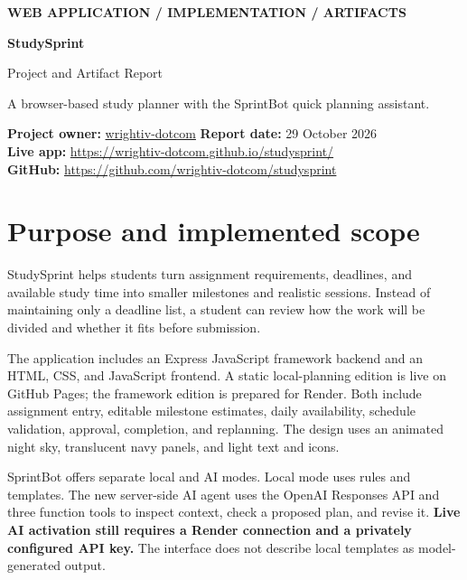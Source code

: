 \documentclass[11pt,letterpaper]{article}
\begin{document}
{\color{blue}\small\bfseries WEB APPLICATION / IMPLEMENTATION / ARTIFACTS}\par
{\Huge\bfseries\color{navy}StudySprint}\par
{\Large Project and Artifact Report}\par
{\color{gray}A browser-based study planner with the SprintBot quick planning assistant.}

\colorbox{pale}{\parbox{\dimexpr\linewidth-2\fboxsep}{\textbf{Project owner:} \href{https://github.com/wrightiv-dotcom}{wrightiv-dotcom}\quad
\textbf{Report date:} 29 October 2026\\[4pt]
\textbf{Live app:} \url{https://wrightiv-dotcom.github.io/studysprint/}\\
\textbf{GitHub:} \url{https://github.com/wrightiv-dotcom/studysprint}}}

\section{Purpose and implemented scope}
StudySprint helps students turn assignment requirements, deadlines, and available study time into smaller milestones and realistic sessions. Instead of maintaining only a deadline list, a student can review how the work will be divided and whether it fits before submission.

The application includes an Express JavaScript framework backend and an HTML, CSS, and JavaScript frontend. A static local-planning edition is live on GitHub Pages; the framework edition is prepared for Render. Both include assignment entry, editable milestone estimates, daily availability, schedule validation, approval, completion, and replanning. The design uses an animated night sky, translucent navy panels, and light text and icons.

SprintBot offers separate local and AI modes. Local mode uses rules and templates. The new server-side AI agent uses the OpenAI Responses API and three function tools to inspect context, check a proposed plan, and revise it. \textbf{Live AI activation still requires a Render connection and a privately configured API key.} The interface does not describe local templates as model-generated output.
\end{document}

